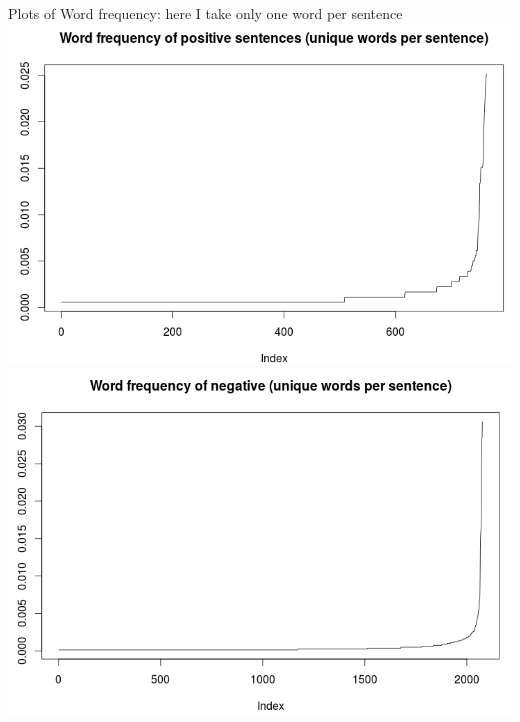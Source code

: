 \documentclass{article}
\begin{document}
\newpage
Plots of Word frequency: here I take only one word per sentence\\
\includegraphics[width=0.9\linewidth]{Word_frequency_pos.png}\\
\includegraphics[width=0.9\linewidth]{Word_frequency_neg.png}\\
\end{document}
